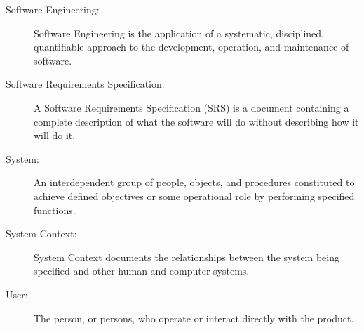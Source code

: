 \documentclass[12pt,titlepage]{article}
\begin{document}
\begin{description}
\item[Software Engineering:] Software Engineering is the application of a systematic, disciplined, quantifiable approach to the development, operation, and maintenance of software. \citep{IEEE1990}

\item[Software Requirements Specification:] A Software Requirements Specification (SRS) is a document containing a complete description of what the software will do without describing how it will do it. \citep{Davis1990}

\item[System:] An interdependent group of people, objects, and procedures constituted to achieve defined objectives or some operational role by performing specified functions. \citep{IEEE1998}

\item[System Context:] System Context documents the relationships between the system being specified and other human and computer systems. \citep{Sommerville1992}

\item[User:]The person, or persons, who operate or interact directly with the product. \citep{IEEE2000}

\end{description}
\end{document}
